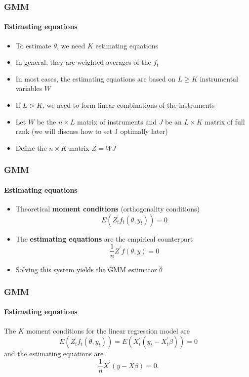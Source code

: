 \documentclass{beamer}
\begin{document}
\begin{frame}\frametitle{GMM}\framesubtitle{Estimating equations}
\begin{itemize}
    \item To estimate $\theta $, we need $K$ estimating equations
    \item In general, they are weighted averages of the $f_{t}$
    \item In most cases, the estimating equations are based on $L\geq K$ instrumental variables $W$
    \item If $L>K$, we need to form linear combinations of the instruments
    \item Let $W$ be the $n\times L$ matrix of instruments and $J$ be an $L\times K$ matrix of full rank (we will discuss how to set J optimally later)
    \item Define the $n\times K$ matrix $Z=WJ$
\end{itemize}
\end{frame}


\begin{frame}\frametitle{GMM}\framesubtitle{Estimating equations}
\begin{itemize}
    \item Theoretical \textbf{moment conditions} (orthogonality conditions)
    \begin{equation*}
    E\left( Z_{t}^{\prime }f_{t}\left( \theta ,y_{t}\right) \right) =0
    \end{equation*}
    \item The \textbf{estimating equations }are the empirical counterpart
    \begin{equation*}
    \frac{1}{n}Z^{\prime }f(\theta ,y)=0
    \end{equation*}
    \item Solving this system yields the GMM estimator $\hat{\theta}$
\end{itemize}
\end{frame}


\begin{frame}\frametitle{GMM}\framesubtitle{Estimating equations}
\begin{example}
    The $K$ moment conditions for the linear regression model are
    \begin{equation*}
    E\left( Z_{t}^{\prime }f_{t}\left( \theta ,y_{t}\right) \right) =E\left(X_{t}^{\prime }\left( y_{t}-X_{t}^{\prime }\beta \right) \right) =0
    \end{equation*}%
    and the estimating equations are
    \begin{equation*}
    \frac{1}{n}X^{\prime }\left( y-X\beta \right) =0.
    \end{equation*}
\end{example}
\end{frame}
\end{document}
